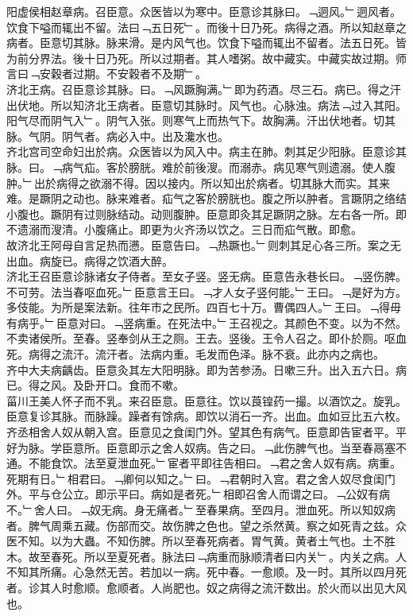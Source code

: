 \documentclass{zhvt-classic}
\begin{document}
\hspace*{2em}阳虚侯相赵章病。召臣意。众医皆以为寒中。臣意诊其脉曰。﹁迵风。﹂迵风者。饮食下嗌而辄出不留。法曰﹁五日死﹂。而後十日乃死。病得之酒。所以知赵章之病者。臣意切其脉。脉来滑。是内风气也。饮食下嗌而辄出不留者。法五日死。皆为前分界法。後十日乃死。所以过期者。其人嗜粥。故中藏实。中藏实故过期。师言曰﹁安穀者过期。不安穀者不及期﹂。\\
\hspace*{2em}济北王病。召臣意诊其脉。曰。﹁风蹶胸满。﹂即为药酒。尽三石。病已。得之汗出伏地。所以知济北王病者。臣意切其脉时。风气也。心脉浊。病法﹁过入其阳。阳气尽而阴气入﹂。阴气入张。则寒气上而热气下。故胸满。汗出伏地者。切其脉。气阴。阴气者。病必入中。出及瀺水也。\\
\hspace*{2em}齐北宫司空命妇出於病。众医皆以为风入中。病主在肺。刺其足少阳脉。臣意诊其脉。曰。﹁病气疝。客於膀胱。难於前後溲。而溺赤。病见寒气则遗溺。使人腹肿。﹂出於病得之欲溺不得。因以接内。所以知出於病者。切其脉大而实。其来难。是蹶阴之动也。脉来难者。疝气之客於膀胱也。腹之所以肿者。言蹶阴之络结小腹也。蹶阴有过则脉结动。动则腹肿。臣意即灸其足蹶阴之脉。左右各一所。即不遗溺而溲清。小腹痛止。即更为火齐汤以饮之。三日而疝气散。即愈。\\
\hspace*{2em}故济北王阿母自言足热而懑。臣意告曰。﹁热蹶也。﹂则刺其足心各三所。案之无出血。病旋已。病得之饮酒大醉。\\
\hspace*{2em}济北王召臣意诊脉诸女子侍者。至女子竖。竖无病。臣意告永巷长曰。﹁竖伤脾。不可劳。法当春呕血死。﹂臣意言王曰。﹁才人女子竖何能。﹂王曰。﹁是好为方。多伎能。为所是案法新。往年市之民所。四百七十万。曹偶四人。﹂王曰。﹁得毋有病乎。﹂臣意对曰。﹁竖病重。在死法中。﹂王召视之。其颜色不变。以为不然。不卖诸侯所。至春。竖奉剑从王之厕。王去。竖後。王令人召之。即仆於厕。呕血死。病得之流汗。流汗者。法病内重。毛发而色泽。脉不衰。此亦内之病也。\\
\hspace*{2em}齐中大夫病齲齿。臣意灸其左大阳明脉。即为苦参汤。日嗽三升。出入五六日。病已。得之风。及卧开口。食而不嗽。\\
\hspace*{2em}菑川王美人怀子而不乳。来召臣意。臣意往。饮以莨锽药一撮。以酒饮之。旋乳。臣意复诊其脉。而脉躁。躁者有馀病。即饮以消石一齐。出血。血如豆比五六枚。\\
\hspace*{2em}齐丞相舍人奴从朝入宫。臣意见之食闺门外。望其色有病气。臣意即告宦者平。平好为脉。学臣意所。臣意即示之舍人奴病。告之曰。﹁此伤脾气也。当至春鬲塞不通。不能食饮。法至夏泄血死。﹂宦者平即往告相曰。﹁君之舍人奴有病。病重。死期有日。﹂相君曰。﹁卿何以知之。﹂曰。﹁君朝时入宫。君之舍人奴尽食闺门外。平与仓公立。即示平曰。病如是者死。﹂相即召舍人而谓之曰。﹁公奴有病不。﹂舍人曰。﹁奴无病。身无痛者。﹂至春果病。至四月。泄血死。所以知奴病者。脾气周乘五藏。伤部而交。故伤脾之色也。望之杀然黄。察之如死青之兹。众医不知。以为大蟲。不知伤脾。所以至春死病者。胃气黄。黄者土气也。土不胜木。故至春死。所以至夏死者。脉法曰﹁病重而脉顺清者曰内关﹂。内关之病。人不知其所痛。心急然无苦。若加以一病。死中春。一愈顺。及一时。其所以四月死者。诊其人时愈顺。愈顺者。人尚肥也。奴之病得之流汗数出。於火而以出见大风也。\\
\end{document}
